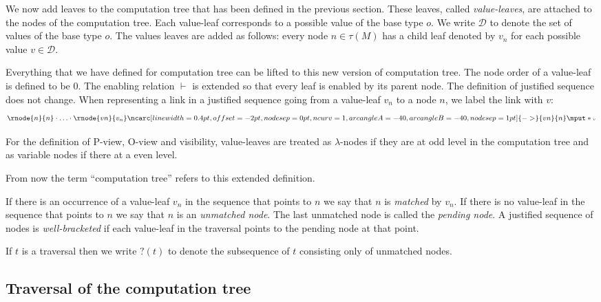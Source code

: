 \documentclass{llncs}
\newcommand{\bkptr}[2][nodesep=0pt]{\ncarc[linewidth=0.4pt,offset=-2pt,nodesep=0pt,ncurv=1,arcangleA=-#2, arcangleB=-#2,#1]{->}}
\newcommand{\bklabel}[1]{\mput*{\mbox{{\tiny $#1$}}}}
\begin{document}
We now add leaves to the computation tree that has been defined in the previous section.
These leaves, called \emph{value-leaves}, are attached to the nodes of the computation tree. Each
value-leaf corresponds to a possible value of the base type $o$.
We write $\mathcal{D}$ to denote the set of values of the base type
$o$. The values leaves are added as follows: every
node $n \in \tau(M)$ has a child leaf denoted by $v_n$ for each possible value $v \in \mathcal{D}$.

Everything that we have defined for computation tree can be lifted
to this new version of computation tree. The node order of a
value-leaf is defined to be $0$. The enabling relation $\vdash$ is
extended so that every leaf is enabled by its parent node. The
definition of justified sequence does not change.
When representing a link in a justified sequence going from a value-leaf $v_n$ to a node $n$,
we label the link with $v$:
$$
\rnode{n}{n} \cdot \ldots \cdot \rnode{vn}{v_n} \bkptr[nodesep=1pt]{40}{vn}{n} \bklabel{v}
$$


For the definition
of P-view, O-view and visibility, value-leaves are treated as
$\lambda$-nodes if they are at odd level in the computation tree and
as variable nodes if there at a even level.

From now the term ``computation tree'' refers to this extended
definition.
\vspace{10pt}

If there is an occurrence of a value-leaf $v_n$ in the sequence that points to $n$ we say that
$n$ is \emph{matched} by $v_n$. If there is no value-leaf in the sequence that points to $n$ we
say that $n$ is an \emph{unmatched node}.
The last unmatched node is called the \emph{pending node}.
A justified sequence of nodes is \emph{well-bracketed} if
each value-leaf in the traversal points to the pending node at that point.

If $t$ is a traversal then we write $?(t)$ to denote the subsequence
of $t$ consisting only of unmatched nodes.

\subsection{Traversal of the computation tree}
\label{subsec:traversal}
\end{document}
